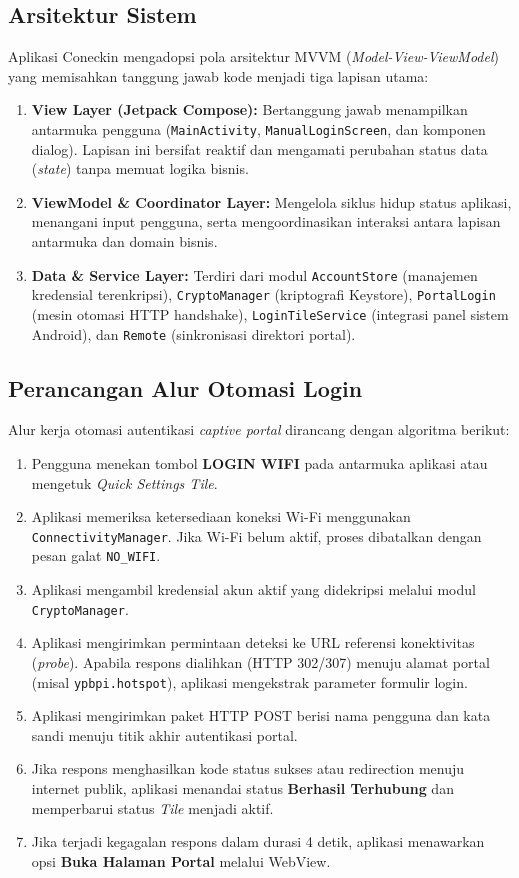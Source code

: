 \subsection{Arsitektur Sistem}
Aplikasi Coneckin mengadopsi pola arsitektur MVVM (\textit{Model-View-ViewModel}) yang memisahkan tanggung jawab kode menjadi tiga lapisan utama:
\begin{enumerate}
    \item \textbf{View Layer (Jetpack Compose):} Bertanggung jawab menampilkan antarmuka pengguna (\texttt{MainActivity}, \texttt{ManualLoginScreen}, dan komponen dialog). Lapisan ini bersifat reaktif dan mengamati perubahan status data (\textit{state}) tanpa memuat logika bisnis.
    \item \textbf{ViewModel \& Coordinator Layer:} Mengelola siklus hidup status aplikasi, menangani input pengguna, serta mengoordinasikan interaksi antara lapisan antarmuka dan domain bisnis.
    \item \textbf{Data \& Service Layer:} Terdiri dari modul \texttt{AccountStore} (manajemen kredensial terenkripsi), \texttt{CryptoManager} (kriptografi Keystore), \texttt{PortalLogin} (mesin otomasi HTTP handshake), \texttt{LoginTileService} (integrasi panel sistem Android), dan \texttt{Remote} (sinkronisasi direktori portal).
\end{enumerate}

\subsection{Perancangan Alur Otomasi Login}
Alur kerja otomasi autentikasi \textit{captive portal} dirancang dengan algoritma berikut:
\begin{enumerate}
    \item Pengguna menekan tombol \textbf{LOGIN WIFI} pada antarmuka aplikasi atau mengetuk \textit{Quick Settings Tile}.
    \item Aplikasi memeriksa ketersediaan koneksi Wi-Fi menggunakan \texttt{ConnectivityManager}. Jika Wi-Fi belum aktif, proses dibatalkan dengan pesan galat \texttt{NO\_WIFI}.
    \item Aplikasi mengambil kredensial akun aktif yang didekripsi melalui modul \texttt{CryptoManager}.
    \item Aplikasi mengirimkan permintaan deteksi ke URL referensi konektivitas (\textit{probe}). Apabila respons dialihkan (HTTP 302/307) menuju alamat portal (misal \texttt{ypbpi.hotspot}), aplikasi mengekstrak parameter formulir login.
    \item Aplikasi mengirimkan paket HTTP POST berisi nama pengguna dan kata sandi menuju titik akhir autentikasi portal.
    \item Jika respons menghasilkan kode status sukses atau redirection menuju internet publik, aplikasi menandai status \textbf{Berhasil Terhubung} dan memperbarui status \textit{Tile} menjadi aktif.
    \item Jika terjadi kegagalan respons dalam durasi 4 detik, aplikasi menawarkan opsi \textbf{Buka Halaman Portal} melalui WebView.
\end{enumerate}

